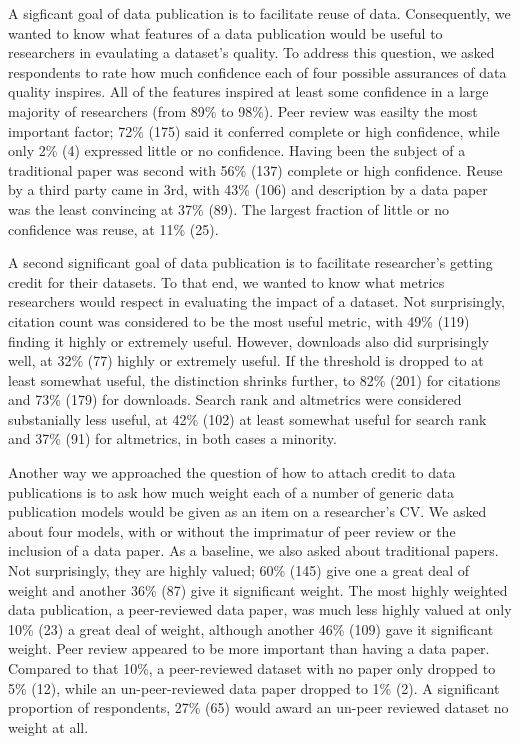 \documentclass[10pt]{article}
\begin{document}
A sigficant goal of data publication is to facilitate reuse of data.
Consequently, we wanted to know what features of a data publication would be useful to researchers in evaulating a dataset's quality.
To address this question, we asked respondents to rate how much confidence each of four possible assurances of data quality inspires.
All of the features inspired at least some confidence in a large majority of researchers (from 89\% to 98\%).
Peer review was easilty the most important factor; 72\% (175) said it conferred complete or high confidence, while only 2\% (4) expressed little or no confidence.
Having been the subject of a traditional paper was second with 56\% (137) complete or high confidence.
Reuse by a third party came in 3rd, with 43\% (106) and description by a data paper was the least convincing at 37\% (89).
The largest fraction of little or no confidence was reuse, at 11\% (25).

A second significant goal of data publication is to facilitate researcher's getting credit for their datasets.
To that end, we wanted to know what metrics researchers would respect in evaluating the impact of a dataset.
Not surprisingly, citation count was considered to be the most useful metric, with 49\% (119) finding it highly or extremely useful. 
However, downloads also did surprisingly well, at 32\% (77) highly or extremely useful.
If the threshold is dropped to at least somewhat useful, the distinction shrinks further, to 82\% (201) for citations and 73\% (179) for downloads.
Search rank and altmetrics were considered substanially less useful, at 42\% (102) at least somewhat useful for search rank and 37\% (91) for altmetrics, in both cases a minority.

Another way we approached the question of how to attach credit to data publications is to ask how much weight each of a number of generic data publication models would be given as an item on a researcher's CV.
We asked about four models, with or without the imprimatur of peer review or the inclusion of a data paper. 
As a baseline, we also asked about traditional papers.
Not surprisingly, they are highly valued; 60\% (145) give one a great deal of weight and another 36\% (87) give it significant weight.
The most highly weighted data publication, a peer-reviewed data paper, was much less highly valued at only 10\% (23) a great deal of weight, although another 46\% (109) gave it significant weight.
Peer review appeared to be more important than having a data paper. 
Compared to that 10\%, a peer-reviewed dataset with no paper only dropped to 5\% (12), while an un-peer-reviewed data paper dropped to 1\% (2).
A significant proportion of respondents, 27\% (65) would award an un-peer reviewed dataset no weight at all.
\end{document}
